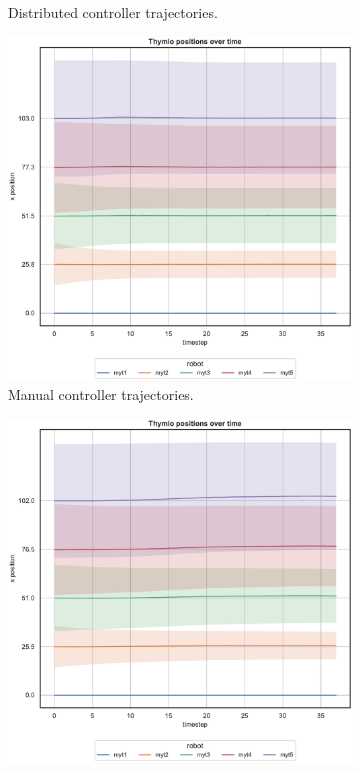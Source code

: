 \begin{figure}[!htb]
\begin{center}
\begin{subfigure}[h]{0.49\textwidth}
			\caption{Distributed controller trajectories.}
		\end{subfigure}
	\end{center}
	\begin{center}
		\begin{subfigure}[h]{0.49\textwidth}
			\centering			
			\includegraphics[width=.95\textwidth]{contents/images/net-d12/position-overtime-manual}%
			\caption{Manual controller trajectories.}
		\end{subfigure}
		\hfill
		\begin{subfigure}[h]{0.49\textwidth}
			\centering
			\includegraphics[width=\textwidth]{contents/images/net-d12/position-overtime-learned_distributed}

\end{subfigure}
\end{center}
\end{figure}
